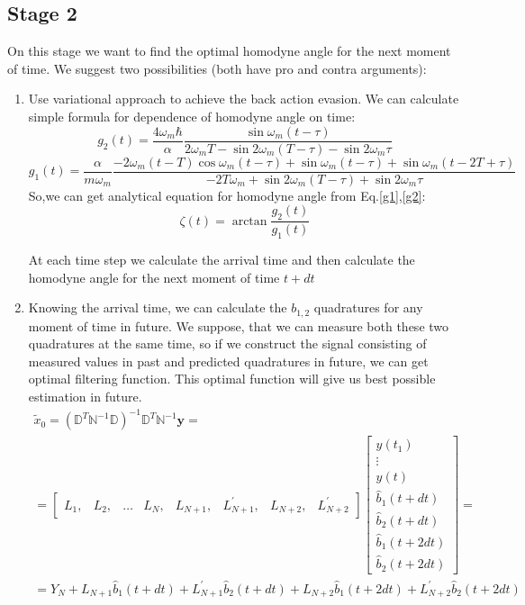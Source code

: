 \documentclass[notitlepage,a4paper,11pt,hyperref=pdftex]{revtex4-1}
\begin{document}
\subsection{Stage 2}
On this stage we want to find the optimal homodyne angle for the next moment of time. We suggest two possibilities (both have pro and contra arguments):
\begin{enumerate}
 \item Use variational approach to achieve the back action evasion. We can calculate simple formula for dependence of homodyne angle on time:
\begin{equation}\label{g2}
 g_2(t) = \frac{4\omega_m\hbar}{\alpha} \frac{\sin\omega_m(t-\tau)}{2\omega_mT-\sin2\omega_m(T-\tau)-\sin2\omega_m\tau}
\end{equation}
\begin{equation}\label{g1}
 g_1(t) = \frac{\alpha}{m \omega_m} \frac{-2\omega_m(t-T)\cos\omega_m(t-\tau) + \sin\omega_m(t-\tau) + \sin\omega_m(t-2T+\tau)}{-2T\omega_m + \sin2\omega_m(T-\tau)+\sin2\omega_m\tau}
\end{equation}
So,we can get analytical equation for homodyne angle from Eq.\ref{g1},\ref{g2}:
\begin{equation}\label{appx:zeta}
 \zeta(t) = \arctan\frac{g_2(t)}{g_1(t)}
\end{equation}

At each time step we calculate the arrival time and then calculate the homodyne angle for the next moment of time $t+dt$
\item Knowing the arrival time, we can calculate the $b_{1,2}$ quadratures for any moment of time in future. We suppose, that we can measure both these two quadratures at the same time, so if we construct
the signal consisting of measured values in past and predicted quadratures in future, we can get optimal filtering function. This optimal function will give us best possible estimation in future.
\begin{multline}\label{x0filt}
 \tilde{x}_0 = (\mathbb{D}^T\mathbb{N}^{-1}\mathbb{D})^{-1}\mathbb{D}^T\mathbb{N}^{-1}\mathbf{y} = \\ =
\begin{bmatrix}
 L_1, & L_2, & \hdots & L_N, & L_{N+1}, & L_{N+1}^{'}, & L_{N+2}, & L_{N+2}^{'}
\end{bmatrix}
\begin{bmatrix}
 y(t_1)\\\vdots\\ y(t) \\ \hat{b}_1(t+dt)\\ \hat{b}_2(t+dt)\\ \hat{b}_1(t+2dt)\\ \hat{b}_2(t+2dt)
\end{bmatrix}
=\\ =Y_N + L_{N+1}\hat{b}_1(t+dt)+L_{N+1}^{'}\hat{b}_2(t+dt)+L_{N+2}\hat{b}_1(t+2dt)+L_{N+2}^{'}\hat{b}_2(t+2dt)
\end{multline}


\end{enumerate}
\end{document}

